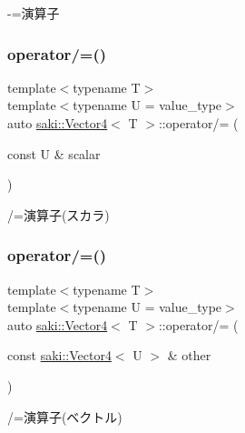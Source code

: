 -\/=演算子 

\mbox{\label{classsaki_1_1_vector4_ad02ea8316a175e5954c51504e021db34}} 
\subsubsection{\texorpdfstring{operator/=()}{operator/=()}\hspace{0.1cm}{\footnotesize\ttfamily [1/2]}}
{\footnotesize\ttfamily template$<$typename T$>$ \\
template$<$typename U  = value\+\_\+type$>$ \\
auto \mbox{\hyperlink{classsaki_1_1_vector4}{saki\+::\+Vector4}}$<$ T $>$\+::operator/= (\begin{DoxyParamCaption}\item[{const U \&}]{scalar }\end{DoxyParamCaption})\hspace{0.3cm}{\ttfamily [inline]}}



/=演算子(スカラ) 

\mbox{\label{classsaki_1_1_vector4_a5007abd7277bf1a27bb6a9eb8e2eceb5}} 
\subsubsection{\texorpdfstring{operator/=()}{operator/=()}\hspace{0.1cm}{\footnotesize\ttfamily [2/2]}}
{\footnotesize\ttfamily template$<$typename T$>$ \\
template$<$typename U  = value\+\_\+type$>$ \\
auto \mbox{\hyperlink{classsaki_1_1_vector4}{saki\+::\+Vector4}}$<$ T $>$\+::operator/= (\begin{DoxyParamCaption}\item[{const \mbox{\hyperlink{classsaki_1_1_vector4}{saki\+::\+Vector4}}$<$ U $>$ \&}]{other }\end{DoxyParamCaption})\hspace{0.3cm}{\ttfamily [inline]}}



/=演算子(ベクトル) 

